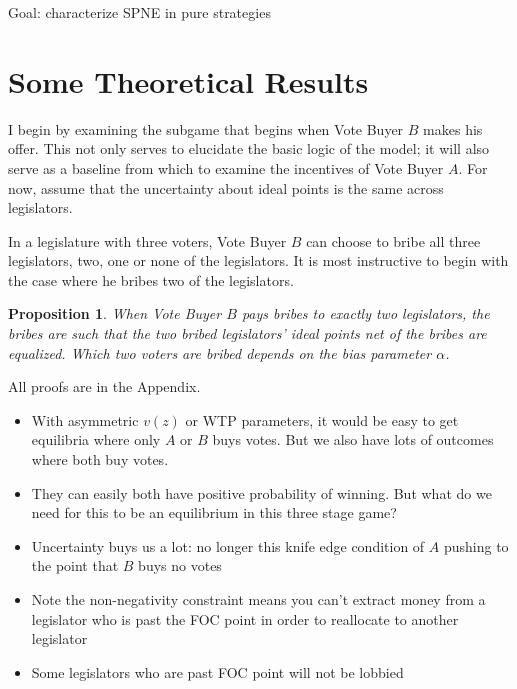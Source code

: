 \documentclass[12pt]{article}
\newtheorem{proposition}{Proposition}
\newcommand{\al}{\alpha}
\begin{document}
Goal: characterize SPNE in pure strategies

\section{Some Theoretical Results}
\label{sec:res}

I begin by examining the subgame that begins when Vote Buyer $B$ makes his offer. This not only serves to elucidate the basic logic of the model; it will also serve as a baseline from which to examine the incentives of Vote Buyer $A$. For now, assume that the uncertainty about ideal points is the same across legislators.

In a legislature with three voters, Vote Buyer $B$ can choose to bribe all three legislators, two, one or none of the legislators. It is most instructive to begin with the case where he bribes two of the legislators.

\begin{proposition}
  When Vote Buyer $B$ pays bribes to exactly two legislators, the bribes are such that the two bribed legislators' ideal points net of the bribes are equalized. Which two voters are bribed depends on the bias parameter $\al$.
	\label{prop:2NNB}
\end{proposition}

All proofs are in the Appendix.

\begin{itemize}
				\item With asymmetric $v(z)$ or WTP parameters, it would be easy to get equilibria where only $A$ or $B$ buys votes. But we also have lots of outcomes where both buy votes.
			\item They can easily both have positive probability of winning. But what do we need for this to be an equilibrium in this three stage game?
			\item Uncertainty buys us a lot: no longer this knife edge condition of $A$ pushing to the point that $B$ buys no votes
			\item Note the non-negativity constraint means you can't extract money from a legislator who is past the FOC point in order to reallocate to another legislator
			\item Some legislators who are past FOC point will not be lobbied		

\end{itemize}
\end{document}
